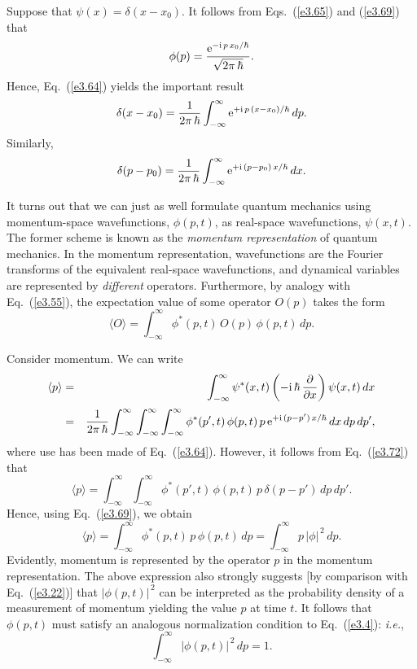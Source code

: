 Suppose that $\psi(x) = \delta(x-x_0)$. It follows from Eqs.~(\ref{e3.65})
and (\ref{e3.69}) that 
\begin{equation}
\phi(p) = \frac{{\rm e}^{-{\rm i}\,p\,x_0/\hbar}}{\sqrt{2\pi\,\hbar}}.
\end{equation}
Hence, Eq.~(\ref{e3.64}) yields the important result
\begin{equation}
\delta(x-x_0)= \frac{1}{2\pi\,\hbar}\int_{-\infty}^{\infty}{\rm e}^{+{\rm i}\,p\,(x-x_0)/\hbar}\,dp.
\end{equation}
Similarly,
\begin{equation}\label{e3.72}
\delta(p-p_0)= \frac{1}{2\pi\,\hbar}\int_{-\infty}^{\infty}{\rm e}^{+{\rm i}\,(p-p_0)\,x/\hbar}\,dx.
\end{equation}

It turns out that we can just as well formulate quantum mechanics using 
momentum-space wavefunctions, $\phi(p,t)$, as real-space wavefunctions, $\psi(x,t)$. The former scheme is known as the {\em momentum representation} of quantum mechanics. In the momentum representation,
wavefunctions are the Fourier transforms of the equivalent real-space
wavefunctions, and dynamical variables are represented by {\em different}\/ operators. Furthermore, by analogy with Eq.~(\ref{e3.55}), the
expectation value of some operator $O(p)$ takes the form
\begin{equation}\label{e4.55a}
\langle O\rangle = \int_{-\infty}^{\infty}\phi^\ast(p,t)\,O(p)\,\phi(p,t)\,dp.
\end{equation}

Consider momentum. We can write
\begin{eqnarray}
\langle p\rangle& =& \int_{-\infty}^{\infty} \psi^\ast(x,t)\left(-{\rm i}\,\hbar\,
\frac{\partial}{\partial x}\right)\psi(x,t)\,dx \nonumber\\[0.5ex]&=& \frac{1}{2\pi\,\hbar}\int_{-\infty}^{\infty}\int_{-\infty}^{\infty}\int_{-\infty}^{\infty}
\phi^\ast(p',t)\,\phi(p,t)\,p\,{\rm e}^{+{\rm i}\,(p-p')\,x/\hbar}\,dx\,dp\,dp',
\end{eqnarray}
where use has been made of Eq.~(\ref{e3.64}).
However, it follows from Eq.~(\ref{e3.72})
that
\begin{equation}
\langle p\rangle = \int_{-\infty}^{\infty}\int_{-\infty}^{\infty}\phi^\ast(p',t)\,\phi(p,t)\,p\,\delta(p-p')\,dp\,dp'.
\end{equation}
Hence, using  Eq.~(\ref{e3.69}), we obtain
\begin{equation}
\langle p\rangle = \int_{-\infty}^{\infty}\phi^\ast(p,t)\,p\,\phi(p,t)\,dp =  \int_{-\infty}^{\infty}p\,|\phi|^{\,2}\,dp.
\end{equation}
Evidently,  momentum is represented by the operator $p$ in the momentum
representation. The above expression also strongly suggests [by comparison with Eq.~(\ref{e3.22})] that $|\phi(p,t)|^{\,2}$ can be interpreted as
the probability density of a measurement of momentum yielding the
value $p$ at time $t$. It follows that $\phi(p,t)$ must satisfy an analogous normalization
condition to Eq.~(\ref{e3.4}): {\em i.e.},
\begin{equation}\label{enormp}
\int_{-\infty}^{\infty} |\phi(p,t)|^{\,2}\,dp = 1.
\end{equation}

